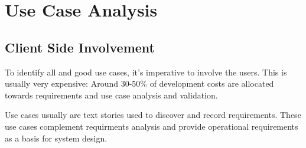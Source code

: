 \documentclass[
../../Software_Engineering_Summary.tex,
]
{subfiles}
\begin{document}
\section{Use Case Analysis}
\subsection{Client Side Involvement}
To identify all and good use cases, it's imperative to involve the users. This is usually very expensive: Around 30-50\% of development costs are allocated towards requirements and use case analysis and validation.

Use cases usually are text stories used to discover and record requirements. These use cases complement requirments analysis and provide operational requirements as a basis for system design.
\end{document}
